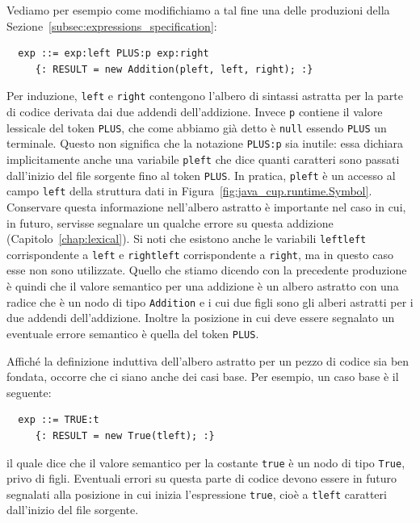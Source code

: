 Vediamo per esempio come modifichiamo a tal fine una delle produzioni
della Sezione~\ref{subsec:expressions_specification}:
%
\begin{verbatim}
  exp ::= exp:left PLUS:p exp:right
     {: RESULT = new Addition(pleft, left, right); :}
\end{verbatim}
%
Per induzione, \texttt{left} e \texttt{right} contengono l'albero
di sintassi astratta per la parte di codice derivata dai due addendi
dell'addizione. Invece \texttt{p} contiene il valore lessicale del
token \texttt{PLUS}, che come abbiamo gi\`a detto \`e \texttt{null}
essendo \texttt{PLUS} un terminale. Questo non significa che
la notazione \texttt{PLUS:p} sia inutile: essa dichiara implicitamente
anche una variabile \texttt{pleft} che dice quanti caratteri sono
passati dall'inizio del file sorgente fino al token \texttt{PLUS}. In pratica,
\texttt{pleft} \`e un accesso al campo \texttt{left} della struttura
dati in Figura~\ref{fig:java_cup.runtime.Symbol}.
Conservare questa informazione nell'albero astratto \`e importante nel caso
in cui, in futuro, servisse segnalare un qualche errore su questa
addizione (Capitolo~\ref{chap:lexical}).
Si noti che esistono anche le variabili \texttt{leftleft} corrispondente
a \texttt{left} e \texttt{rightleft} corrispondente a \texttt{right}, ma
in questo caso esse non sono utilizzate. Quello che stiamo
dicendo con la precedente produzione \`e quindi
che il valore semantico per una addizione \`e un
albero astratto con una radice che \`e un nodo di tipo \texttt{Addition}
e i cui due figli sono gli alberi astratti per i due addendi dell'addizione.
Inoltre la posizione in cui deve essere segnalato un eventuale errore
semantico \`e quella del token \texttt{PLUS}.

Affich\'e la definizione induttiva dell'albero astratto per un pezzo di codice
sia ben fondata, occorre che ci siano anche dei casi base. Per esempio,
un caso base \`e il seguente:
%
\begin{verbatim}
  exp ::= TRUE:t
     {: RESULT = new True(tleft); :}
\end{verbatim}
%
il quale dice che il valore semantico per la costante \texttt{true}
\`e un nodo di tipo \texttt{True}, privo di figli. Eventuali
errori su questa parte di codice devono essere in futuro segnalati
alla posizione in cui inizia l'espressione \texttt{true}, cio\`e a
\texttt{tleft} caratteri dall'inizio del file sorgente.

